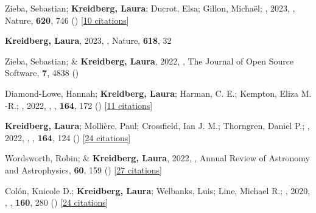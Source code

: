 \item[{\color{numcolor}\scriptsize23}] Zieba, Sebastian; \textbf{Kreidberg, Laura}; Ducrot, Elsa; Gillon, Micha{\"e}l; \etal, 2023, , Nature, \textbf{620}, 746 () [\href{https://ui.adsabs.harvard.edu/abs/2023Natur.620..746Z}{10 citations}]

\item[{\color{numcolor}\scriptsize22}] \textbf{Kreidberg, Laura}, 2023, , Nature, \textbf{618}, 32

\item[{\color{numcolor}\scriptsize21}] Zieba, Sebastian; \& \textbf{Kreidberg, Laura}, 2022, , The Journal of Open Source Software, \textbf{7}, 4838 ()

\item[{\color{numcolor}\scriptsize20}] Diamond-Lowe, Hannah; \textbf{Kreidberg, Laura}; Harman, C. E.; Kempton, Eliza M. -R.; \etal, 2022, , \aj, \textbf{164}, 172 () [\href{https://ui.adsabs.harvard.edu/abs/2022AJ....164..172D}{11 citations}]

\item[{\color{numcolor}\scriptsize19}] \textbf{Kreidberg, Laura}; Molli{\`e}re, Paul; Crossfield, Ian J. M.; Thorngren, Daniel P.; \etal, 2022, , \aj, \textbf{164}, 124 () [\href{https://ui.adsabs.harvard.edu/abs/2022AJ....164..124K}{24 citations}]

\item[{\color{numcolor}\scriptsize18}] Wordsworth, Robin; \& \textbf{Kreidberg, Laura}, 2022, , Annual Review of Astronomy and Astrophysics, \textbf{60}, 159 () [\href{https://ui.adsabs.harvard.edu/abs/2022ARA&A..60..159W}{27 citations}]

\item[{\color{numcolor}\scriptsize17}] Col{\'o}n, Knicole D.; \textbf{Kreidberg, Laura}; Welbanks, Luis; Line, Michael R.; \etal, 2020, , \aj, \textbf{160}, 280 () [\href{https://ui.adsabs.harvard.edu/abs/2020AJ....160..280C}{24 citations}]

